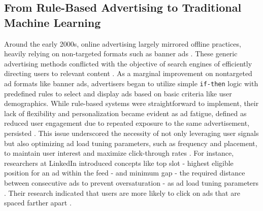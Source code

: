 \documentclass[manuscript,review,screen]{acmart}
\begin{document}
\subsection{From Rule-Based Advertising to Traditional Machine Learning}
Around the early 2000s, online advertising largely mirrored offline practices, heavily relying on non-targeted formats such as banner ads \cite{kant2021history}. These generic advertising methods conflicted with the objective of search engines of efficiently directing users to relevant content \cite{fain2006sponsored}. As a marginal improvement on nontargeted ad formats like banner ads, advertisers began to utilize simple \texttt{if-then} logic with predefined rules to select and display ads based on basic criteria like user demographics. While rule-based systems were straightforward to implement, their lack of flexibility and personalization became evident as ad fatigue, defined as reduced user engagement due to repeated exposure to the same advertisement, persisted \cite{abrams2007personalized}. This issue underscored the necessity of not only leveraging user signals but also optimizing ad load tuning parameters, such as frequency and placement, to maintain user interest and maximize click-through rates \cite{abrams2007personalized}. For instance, researchers at LinkedIn introduced concepts like top slot - highest eligible position for an ad within the feed -  and minimum gap - the required distance between consecutive ads to prevent oversaturation - as ad load tuning parameters \cite{yan2020ads}. Their research indicated that users are more likely to click on ads that are spaced farther apart \cite{yan2020ads}. \\
\end{document}
